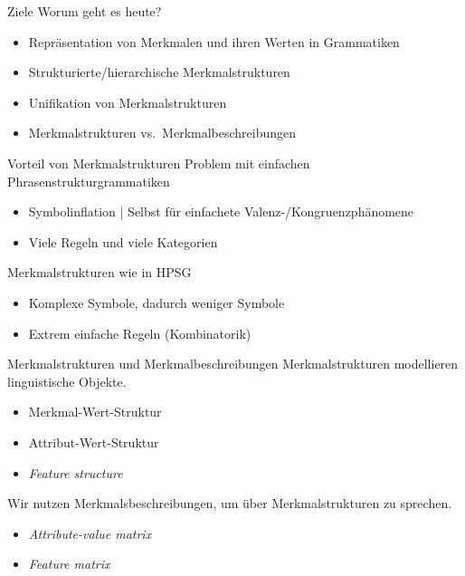 
\begin{frame}
  {Ziele}
  \onslide<+->
  \onslide<+->
  Worum geht es heute?\\
  \Zeile
  \begin{itemize}[<+->]
    \item Repräsentation von Merkmalen und ihren Werten in Grammatiken
    \item Strukturierte\slash hierarchische Merkmalstrukturen
    \item Unifikation von Merkmalstrukturen
    \item Merkmalstrukturen vs.\ Merkmalbeschreibungen
  \end{itemize}
  \Zeile
  \centering
  \onslide<+->
\end{frame}


\begin{frame}
  {Vorteil von Merkmalstrukturen}
  \onslide<+->
  \onslide<+->
  Problem mit einfachen \alert{Phrasenstrukturgrammatiken}\\
  \Halbzeile
  \begin{itemize}[<+->]
    \item \alert{Symbolinflation} | Selbst für einfachete Valenz-\slash Kongruenzphänomene
    \item Viele Regeln und viele Kategorien
  \end{itemize}
  \onslide<+->
  \Zeile
  \alert{Merkmalstrukturen} wie in HPSG\\
  \Halbzeile
  \begin{itemize}[<+->]
    \item \alert{Komplexe Symbole}, dadurch weniger Symbole
    \item Extrem einfache \alert{Regeln} (Kombinatorik)
  \end{itemize}
\end{frame}

\begin{frame}
  {Merkmalstrukturen und Merkmalbeschreibungen}
  \onslide<+->
  \onslide<+->
  \alert{Merkmalstrukturen} modellieren linguistische Objekte.\\
  \Halbzeile
  \begin{itemize}[<+->]
    \item Merkmal-Wert-Struktur
    \item Attribut-Wert-Struktur
    \item \emph{Feature structure}
  \end{itemize}
  \onslide<+->
  \Zeile
  Wir nutzen \alert{Merkmalsbeschreibungen}, um über Merkmalstrukturen zu sprechen.\\
  \Halbzeile
  \begin{itemize}[<+->]
    \item \emph{Attribute-value matrix}
    \item \emph{Feature matrix}
  \end{itemize}
  \onslide<+->
  \Zeile
  \centering 
\end{frame}

